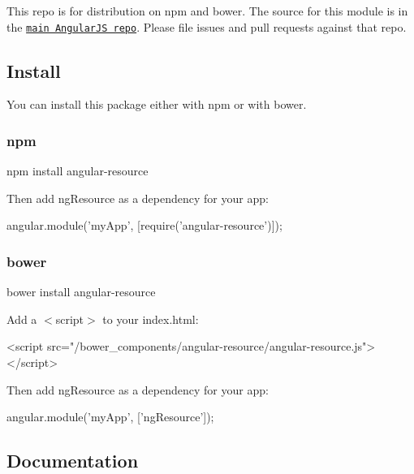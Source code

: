 This repo is for distribution on {\ttfamily npm} and {\ttfamily bower}. The source for this module is in the \href{https://github.com/angular/angular.js/tree/master/src/ngResource}{\tt main Angular\+JS repo}. Please file issues and pull requests against that repo.

\subsection*{Install}

You can install this package either with {\ttfamily npm} or with {\ttfamily bower}.

\subsubsection*{npm}


\begin{DoxyCode}
npm install angular-resource
\end{DoxyCode}


Then add {\ttfamily ng\+Resource} as a dependency for your app\+:


\begin{DoxyCode}
angular.module('myApp', [require('angular-resource')]);
\end{DoxyCode}


\subsubsection*{bower}


\begin{DoxyCode}
bower install angular-resource
\end{DoxyCode}


Add a {\ttfamily $<$script$>$} to your {\ttfamily index.\+html}\+:


\begin{DoxyCode}
<script src="/bower\_components/angular-resource/angular-resource.js"></script>
\end{DoxyCode}


Then add {\ttfamily ng\+Resource} as a dependency for your app\+:


\begin{DoxyCode}
angular.module('myApp', ['ngResource']);
\end{DoxyCode}


\subsection*{Documentation}

